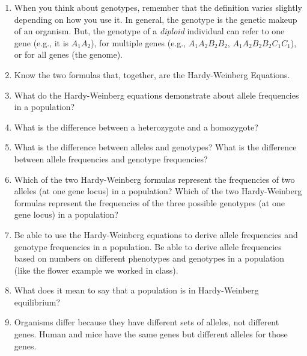 \documentclass[letterpaper]{tufte-handout}
\begin{document}
\begin{enumerate}

	\item When you think about genotypes, remember that the
	definition varies slightly depending on how you use it. In
	general, the genotype is the genetic makeup of an organism. 
	But, the genotype of a \emph{diploid}%
	individual can refer to one gene (e.g., it is $A_1A_2$), 
	for multiple genes (e.g., 
	$A_1A_2B_2B_2$, $A_1A_2B_2B_2C_1C_1$), or for all genes (the genome).

	\item Know the two formulas that, together, are the Hardy-Weinberg Equations.

	\item What do the Hardy-Weinberg equations demonstrate about allele frequencies in a population?

	\item What is the difference between a heterozygote and a homozygote?

	\item What is the difference between alleles and genotypes?  What is the difference between allele frequencies and genotype frequencies?

	\item Which of the two Hardy-Weinberg formulas represent the frequencies of two alleles (at one gene locus) in a population?  Which of the two Hardy-Weinberg formulas represent the frequencies of the three possible genotypes (at one gene locus) in a population?

	\item Be able to use the Hardy-Weinberg equations to derive allele frequencies and genotype frequencies in a population.  Be able to derive allele frequencies based on numbers on different phenotypes and genotypes in a population (like the flower example we worked in class). 

	\item What does it mean to say that a population is in Hardy-Weinberg equilibrium?

	\item Organisms differ because they have different sets of alleles, not different genes.%
	Human and mice have the same genes but different alleles for 
	those genes.
\end{enumerate}
\end{document}
